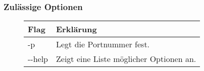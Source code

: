 \subsubsection{Zulässige Optionen}
\begin{figure}[H]
    \centering
    \begin{tabular}{|p{2cm}|p{12cm} |}
        \hline
        Flag & Erklärung \\\hline
        -p & Legt die Portnummer fest.\\
        \hline
        -{}-help & Zeigt eine Liste möglicher Optionen an.\\\hline
    \end{tabular}
\end{figure}

